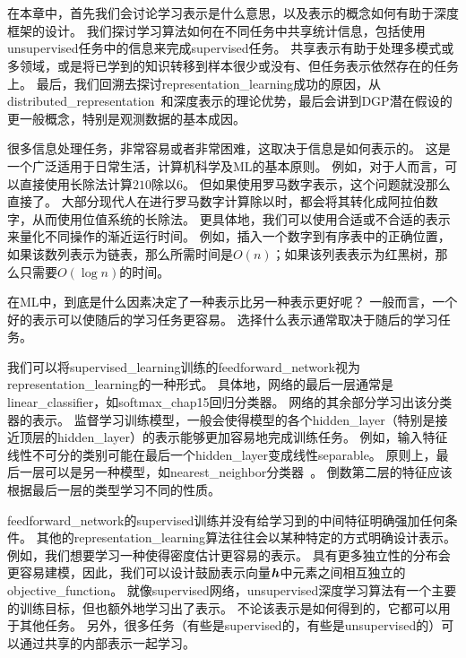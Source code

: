 \chapter{}
\label{chap:representation_learning}


在本章中，首先我们会讨论学习表示是什么意思，以及表示的概念如何有助于深度框架的设计。
我们探讨学习算法如何在不同任务中共享统计信息，包括使用\gls{unsupervised}任务中的信息来完成\gls{supervised}任务。
共享表示有助于处理多模式或多领域，或是将已学到的知识转移到样本很少或没有、但任务表示依然存在的任务上。
最后，我们回溯去探讨\gls{representation_learning}成功的原因，从\gls{distributed_representation}~\citep{Hinton-et-al-PDP1986}和深度表示的理论优势，最后会讲到\gls{DGP}潜在假设的更一般概念，特别是观测数据的基本成因。


很多信息处理任务，非常容易或者非常困难，这取决于信息是如何表示的。
这是一个广泛适用于日常生活，计算机科学及\gls{ML}的基本原则。
例如，对于人而言，可以直接使用长除法计算$210$除以$6$。
但如果使用罗马数字表示，这个问题就没那么直接了。
大部分现代人在进行罗马数字计算除以时，都会将其转化成阿拉伯数字，从而使用位值系统的长除法。
更具体地，我们可以使用合适或不合适的表示来量化不同操作的渐近运行时间。
例如，插入一个数字到有序表中的正确位置，如果该数列表示为链表，那么所需时间是$O(n)$；如果该列表表示为红黑树，那么只需要$O(\log n)$的时间。


在\gls{ML}中，到底是什么因素决定了一种表示比另一种表示更好呢？
一般而言，一个好的表示可以使随后的学习任务更容易。
选择什么表示通常取决于随后的学习任务。



我们可以将\gls{supervised_learning}训练的\gls{feedforward_network}视为\gls{representation_learning}的一种形式。
具体地，网络的最后一层通常是\gls{linear_classifier}，如\gls{softmax_chap15}回归分类器。
网络的其余部分学习出该分类器的表示。
监督学习训练模型，一般会使得模型的各个\gls{hidden_layer}（特别是接近顶层的\gls{hidden_layer}）的表示能够更加容易地完成训练任务。
例如，输入特征线性不可分的类别可能在最后一个\gls{hidden_layer}变成线性\gls{separable}。
原则上，最后一层可以是另一种模型，如\gls{nearest_neighbor}分类器~\citep{SalakhutdinovR2007-small}。
倒数第二层的特征应该根据最后一层的类型学习不同的性质。


\gls{feedforward_network}的\gls{supervised}训练并没有给学习到的中间特征明确强加任何条件。
其他的\gls{representation_learning}算法往往会以某种特定的方式明确设计表示。
例如，我们想要学习一种使得密度估计更容易的表示。
具有更多独立性的分布会更容易建模，因此，我们可以设计鼓励表示向量$\boldsymbol{\mathit{h}}$中元素之间相互独立的\gls{objective_function}。
就像\gls{supervised}网络，\gls{unsupervised}深度学习算法有一个主要的训练目标，但也额外地学习出了表示。
不论该表示是如何得到的，它都可以用于其他任务。
另外，很多任务（有些是\gls{supervised}的，有些是\gls{unsupervised}的）可以通过共享的内部表示一起学习。



